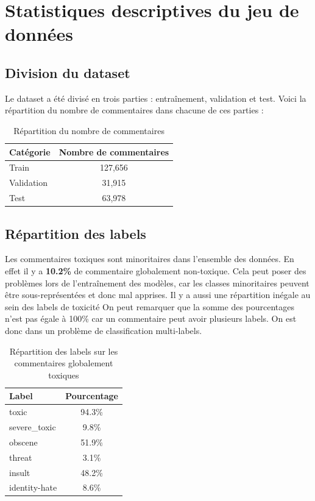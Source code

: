 \chapter{Statistiques descriptives du jeu de données}
\section*{Division du dataset}
Le dataset a été divisé en trois parties : entraînement, validation et test. Voici la répartition du nombre de commentaires dans chacune de ces parties :
\begin{table}[h]
\centering
\begin{tabular}{lc}
\toprule
\textbf{Catégorie} & \textbf{Nombre de commentaires} \\
\midrule
Train & 127,656 \\
Validation & 31,915 \\
Test & 63,978 \\
\bottomrule
\end{tabular}
\caption{Répartition du nombre de commentaires}
\end{table}


\section*{Répartition des labels}
Les commentaires toxiques sont minoritaires dans l'ensemble des données. 
En effet il y a \textbf{10.2\%} de commentaire globalement non-toxique. 
Cela peut poser des problèmes lors de l'entraînement des modèles, car les classes minoritaires peuvent être sous-représentées et donc mal apprises.
Il y a aussi une répartition inégale au sein des labels de toxicité
On peut remarquer que la somme des pourcentages n'est pas égale à 100\% car un commentaire peut avoir plusieurs labels. 
On est donc dans un problème de classification multi-labels.
\begin{table}[h]
\centering
\begin{tabular}{lc}
\toprule
\textbf{Label} & \textbf{Pourcentage} \\
\midrule
toxic & 94.3\% \\
severe\_toxic & 9.8\% \\
obscene & 51.9\% \\
threat & 3.1\% \\
insult & 48.2\% \\
identity-hate & 8.6\% \\ %
\bottomrule
\end{tabular}
\caption{Répartition des labels sur les commentaires globalement toxiques}
\end{table}


